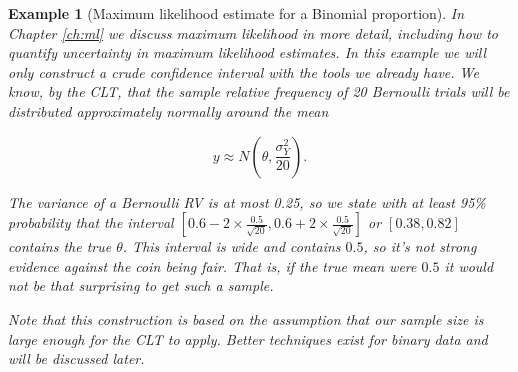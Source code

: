 \documentclass{book}
\theoremstyle{plain}%
\newtheorem{prototheorem}{Example}[section]
\newenvironment{cexample}
   {\colorlet{shadecolor}{gray!10}\begin{shaded}\begin{prototheorem}}
   {\end{prototheorem}\end{shaded}}
\theoremstyle{definition}
\begin{document}
\begin{cexample}[Maximum likelihood estimate for a Binomial proportion]
In Chapter \ref{ch:ml} we discuss maximum likelihood in more detail, including how to quantify uncertainty in maximum likelihood estimates. In this example we will only construct a crude confidence interval with the tools we already have. We know, by the CLT, that the sample relative frequency of 20 Bernoulli trials will be distributed approximately normally around the mean

$$y \approx N(\theta, \frac{\sigma^2_Y}{20}).$$

The variance of a Bernoulli RV is at most 0.25, so we state with at least 95\% probability that the interval $[0.6 - 2 \times \frac{0.5}{\sqrt{20}}, 0.6 + 2 \times \frac{0.5}{\sqrt{20}}]$ or $[0.38, 0.82]$ contains the true $\theta$. This interval is wide and contains $0.5$, so it's not strong evidence against the coin being fair. That is, if the true mean were $0.5$ it would not be that surprising to get such a sample.

Note that this construction is based on the assumption that our sample size is large enough for the CLT to apply. Better techniques exist for binary data and will be discussed later.\label{example:ml}
\end{cexample}
\end{document}
